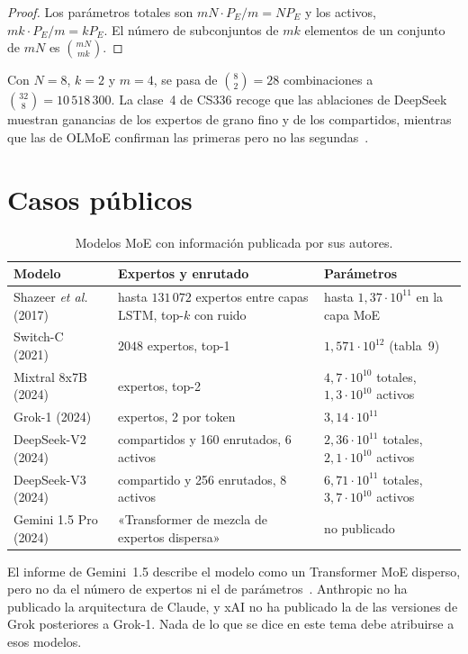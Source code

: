 \begin{proof}
Los parámetros totales son $mN\cdot P_E/m=NP_E$ y los activos, $mk\cdot P_E/m=kP_E$. El número de subconjuntos de $mk$ elementos de un conjunto de $mN$ es $\binom{mN}{mk}$.
\end{proof}

Con $N=8$, $k=2$ y $m=4$, se pasa de $\binom82=28$ combinaciones a $\binom{32}{8}=10\,518\,300$. La clase~4 de CS336 recoge que las ablaciones de DeepSeek muestran ganancias de los expertos de grano fino y de los compartidos, mientras que las de OLMoE confirman las primeras pero no las segundas~\cite{cs336}.

\section{Casos públicos}

\begin{table}[ht]
\centering\small
\caption{Modelos MoE con información publicada por sus autores.}\label{tab:moe}
\begin{tabularx}{\textwidth}{@{}l>{\raggedright\arraybackslash}X>{\raggedright\arraybackslash}X@{}}
\toprule
Modelo & Expertos y enrutado & Parámetros \\
\midrule
Shazeer \emph{et al.} (2017)~\cite{shazeer2017} & hasta $131\,072$ expertos entre capas LSTM, top-$k$ con ruido & hasta $1{,}37\cdot 10^{11}$ en la capa MoE \\
Switch-C (2021)~\cite{switch} & $2048$ expertos, top-1 & $1{,}571\cdot 10^{12}$ (tabla~9) \\
Mixtral 8x7B (2024)~\cite{mixtral} & 8 expertos, top-2 & $4{,}7\cdot 10^{10}$ totales, $1{,}3\cdot 10^{10}$ activos \\
Grok-1 (2024)~\cite{grok1} & 8 expertos, 2 por token & $3{,}14\cdot 10^{11}$ \\
DeepSeek-V2 (2024)~\cite{deepseekv2} & 2 compartidos y 160 enrutados, 6 activos & $2{,}36\cdot 10^{11}$ totales, $2{,}1\cdot 10^{10}$ activos \\
DeepSeek-V3 (2024)~\cite{deepseekv3} & 1 compartido y 256 enrutados, 8 activos & $6{,}71\cdot 10^{11}$ totales, $3{,}7\cdot 10^{10}$ activos \\
Gemini 1.5 Pro (2024)~\cite{gemini15} & «Transformer de mezcla de expertos dispersa» & no publicado \\
\bottomrule
\end{tabularx}
\end{table}

\begin{observacion}
El informe de Gemini~1.5 describe el modelo como un Transformer MoE disperso, pero no da el número de expertos ni el de parámetros~\cite[§3.1]{gemini15}. Anthropic no ha publicado la arquitectura de Claude, y xAI no ha publicado la de las versiones de Grok posteriores a Grok-1. Nada de lo que se dice en este tema debe atribuirse a esos modelos.
\end{observacion}

